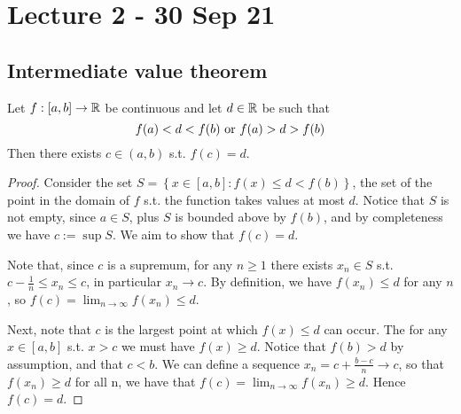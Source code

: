 \section{Lecture 2 - 30 Sep 21}
\subsection{Intermediate value theorem}
\begin{theorem}
  Let $f:[a,b]\to\mathbb R$ be continuous and let $d\in\mathbb R$ be such that
  \[f(a)<d<f(b) \textrm{ or } f(a)>d>f(b)\]
  Then there exists $c\in(a,b)$ s.t. $f(c)=d$.
  \label{ivt}
\end{theorem}
\begin{proof}
  Consider the set $S=\left\{ x\in [a,b] :f(x)\leq d <f(b)\right\}$, the set of the point
  in the domain of $f$ s.t. the function takes values at most $d$.
  Notice that $S$ is not empty, since $a\in S$, plus $S$ is bounded above by $f(b)$, and
  by completeness we have $c:=\sup S$. We
  aim to show that $f(c)=d$. 

  Note that, since $c$ is a supremum, for any $n\geq 1$ there exists $x_n\in S$ s.t.
  $c-\frac{1}{n}\leq x_n\leq c$, in particular $x_n\to c$. By definition, we have
  $f(x_n)\leq d$ for any $n$, so $f(c)=\lim_{n\to\infty} f(x_n)\leq d$.

  Next, note that $c$ is the largest point at which $f(x)\leq d$ can occur. The for any
  $x\in [a,b]$ s.t. $x>c$ we must have $f(x)\geq d$. Notice that $f(b)>d$ by assumption,
  and that $c< b$. We can define a sequence $x_n=c+\frac{b-c}{n}\to c$, so that
  $f(x_n)\geq d$ for all n, we have that $f(c)=\lim_{n\to\infty} f(x_n)\geq d$. Hence
  $f(c)=d$.
\end{proof}

